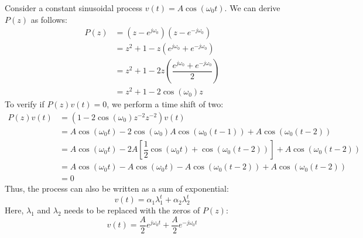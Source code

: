 \begin{example}
    Consider a constant sinusoidal process $v(t)=A \cos \left( \omega_0 t\right)$. 
    We can derive $P(z)$ as follows: 
    \begin{align*}
        P(z) &= \left(z-e^{j\omega_0}\right)\left(z-e^{-j\omega_0}\right) \\
             &= z^2+1-z\left(e^{j\omega_0}+e^{-j\omega_0}\right) \\
             &= z^2+1-2z\left(\dfrac{e^{j\omega_0}+e^{-j\omega_0}}{2}\right) \\
             &= z^2+1-2\cos (\omega_0)z
    \end{align*}
    To verify if $P(z)v(t)=0$, we perform a time shift of two:
    \begin{align*}
        P(z)v(t)&= \left(1-2\cos (\omega_0)z^{-2} z^{-2} \right)v(t) \\
                &= A \cos(\omega_0 t)-2\cos (\omega_0)A\cos(\omega_0(t-1))+A\cos(\omega_0(t-2)) \\
                &= A \cos(\omega_0 t)-2A \left[ \dfrac{1}{2}\cos\left( \omega_0t\right) +\cos\left(\omega_0(t-2)\right)  \right]+A\cos(\omega_0(t-2)) \\
                &= A \cos(\omega_0 t)-A\cos\left( \omega_0t\right) -A\cos\left(\omega_0(t-2)\right) +A\cos(\omega_0(t-2)) \\
                &= 0
    \end{align*}
    Thus, the process can also be written as a sum of exponential:
    \[v(t)=\alpha_1\lambda_1^t+\alpha_2\lambda_2^t\]
    Here, $\lambda_1$ and $\lambda_2$ needs to be replaced with the zeros of $P(z)$: 
    \[v(t)=\dfrac{A}{2}e^{j\omega_0t}+\dfrac{A}{2}e^{-j\omega_0t}\]
\end{example}
